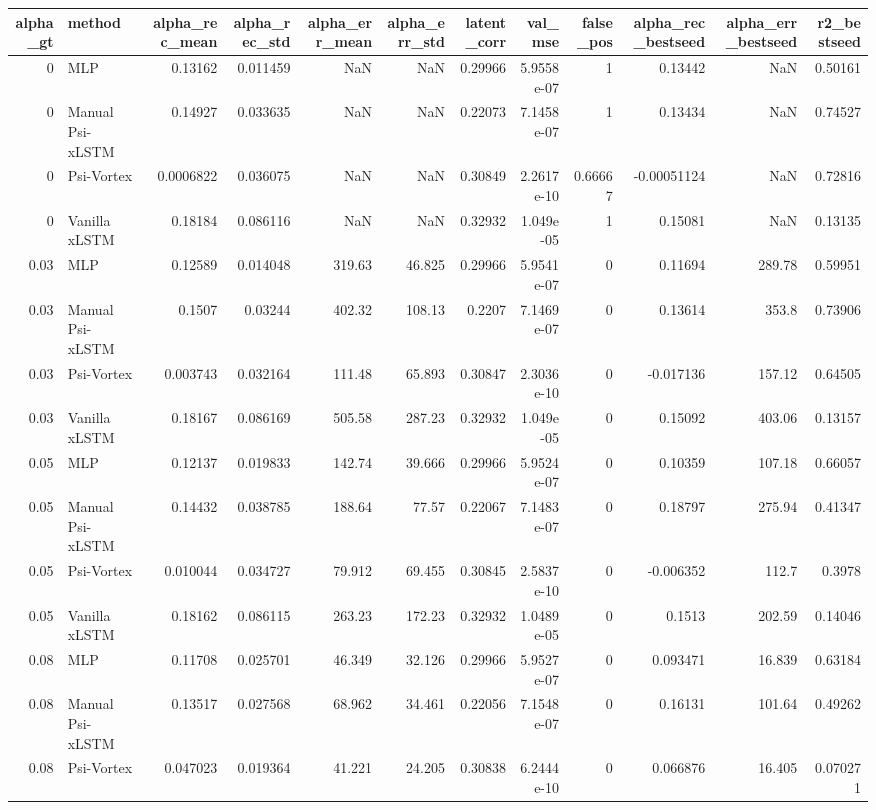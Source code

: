 \begin{tabular}{rlrrrrrrrrrr}
\toprule
alpha_gt & method & alpha_rec_mean & alpha_rec_std & alpha_err_mean & alpha_err_std & latent_corr & val_mse & false_pos & alpha_rec_bestseed & alpha_err_bestseed & r2_bestseed \\
\midrule
0 & MLP & 0.13162 & 0.011459 & NaN & NaN & 0.29966 & 5.9558e-07 & 1 & 0.13442 & NaN & 0.50161 \\
0 & Manual Psi-xLSTM & 0.14927 & 0.033635 & NaN & NaN & 0.22073 & 7.1458e-07 & 1 & 0.13434 & NaN & 0.74527 \\
0 & Psi-Vortex & 0.0006822 & 0.036075 & NaN & NaN & 0.30849 & 2.2617e-10 & 0.66667 & -0.00051124 & NaN & 0.72816 \\
0 & Vanilla xLSTM & 0.18184 & 0.086116 & NaN & NaN & 0.32932 & 1.049e-05 & 1 & 0.15081 & NaN & 0.13135 \\
0.03 & MLP & 0.12589 & 0.014048 & 319.63 & 46.825 & 0.29966 & 5.9541e-07 & 0 & 0.11694 & 289.78 & 0.59951 \\
0.03 & Manual Psi-xLSTM & 0.1507 & 0.03244 & 402.32 & 108.13 & 0.2207 & 7.1469e-07 & 0 & 0.13614 & 353.8 & 0.73906 \\
0.03 & Psi-Vortex & 0.003743 & 0.032164 & 111.48 & 65.893 & 0.30847 & 2.3036e-10 & 0 & -0.017136 & 157.12 & 0.64505 \\
0.03 & Vanilla xLSTM & 0.18167 & 0.086169 & 505.58 & 287.23 & 0.32932 & 1.049e-05 & 0 & 0.15092 & 403.06 & 0.13157 \\
0.05 & MLP & 0.12137 & 0.019833 & 142.74 & 39.666 & 0.29966 & 5.9524e-07 & 0 & 0.10359 & 107.18 & 0.66057 \\
0.05 & Manual Psi-xLSTM & 0.14432 & 0.038785 & 188.64 & 77.57 & 0.22067 & 7.1483e-07 & 0 & 0.18797 & 275.94 & 0.41347 \\
0.05 & Psi-Vortex & 0.010044 & 0.034727 & 79.912 & 69.455 & 0.30845 & 2.5837e-10 & 0 & -0.006352 & 112.7 & 0.3978 \\
0.05 & Vanilla xLSTM & 0.18162 & 0.086115 & 263.23 & 172.23 & 0.32932 & 1.0489e-05 & 0 & 0.1513 & 202.59 & 0.14046 \\
0.08 & MLP & 0.11708 & 0.025701 & 46.349 & 32.126 & 0.29966 & 5.9527e-07 & 0 & 0.093471 & 16.839 & 0.63184 \\
0.08 & Manual Psi-xLSTM & 0.13517 & 0.027568 & 68.962 & 34.461 & 0.22056 & 7.1548e-07 & 0 & 0.16131 & 101.64 & 0.49262 \\
0.08 & Psi-Vortex & 0.047023 & 0.019364 & 41.221 & 24.205 & 0.30838 & 6.2444e-10 & 0 & 0.066876 & 16.405 & 0.070271 \\

\end{tabular}
